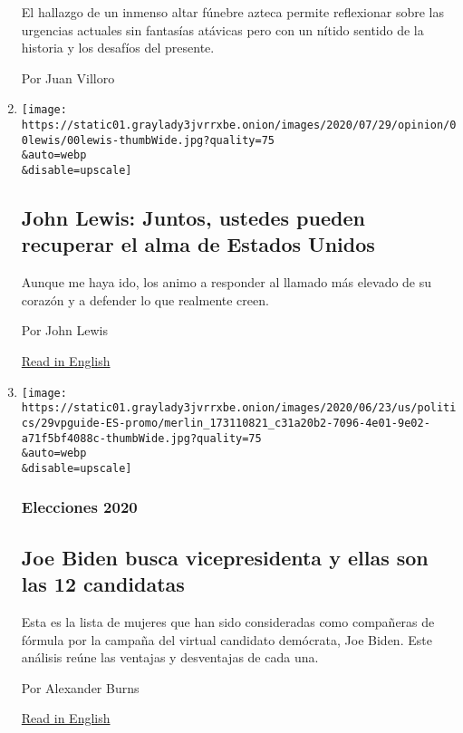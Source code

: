 \begin{enumerate}
  El hallazgo de un inmenso altar fúnebre azteca permite reflexionar
  sobre las urgencias actuales sin fantasías atávicas pero con un nítido
  sentido de la historia y los desafíos del presente.

  Por Juan Villoro
\item
  \href{/es/2020/07/30/espanol/opinion/john-lewis-derechos-civiles.html}{}

  \texttt{[image: https://static01.graylady3jvrrxbe.onion/images/2020/07/29/opinion/00lewis/00lewis-thumbWide.jpg?quality=75\\\&auto=webp\\\&disable=upscale]}

  \hypertarget{john-lewis-juntos-ustedes-pueden-recuperar-el-alma-de-estados-unidos}{%
  \subsection{John Lewis: Juntos, ustedes pueden recuperar el alma de
  Estados
  Unidos}\label{john-lewis-juntos-ustedes-pueden-recuperar-el-alma-de-estados-unidos}}

  Aunque me haya ido, los animo a responder al llamado más elevado de su
  corazón y a defender lo que realmente creen.

  Por John Lewis

  \href{https://www.nytimes3xbfgragh.onion/2020/07/30/opinion/john-lewis-civil-rights-america.html}{Read
  in English}
\item
  \href{/es/2020/07/29/espanol/estados-unidos/biden-vicepresidente.html}{}

  \texttt{[image: https://static01.graylady3jvrrxbe.onion/images/2020/06/23/us/politics/29vpguide-ES-promo/merlin\_173110821\_c31a20b2-7096-4e01-9e02-a71f5bf4088c-thumbWide.jpg?quality=75\\\&auto=webp\\\&disable=upscale]}

  \hypertarget{elecciones-2020-1}{%
  \subsubsection{Elecciones 2020}\label{elecciones-2020-1}}

  \hypertarget{joe-biden-busca-vicepresidenta-y-ellas-son-las-12-candidatas}{%
  \subsection{Joe Biden busca vicepresidenta y ellas son las 12
  candidatas}\label{joe-biden-busca-vicepresidenta-y-ellas-son-las-12-candidatas}}

  Esta es la lista de mujeres que han sido consideradas como compañeras
  de fórmula por la campaña del virtual candidato demócrata, Joe Biden.
  Este análisis reúne las ventajas y desventajas de cada una.

  Por Alexander Burns

  \href{https://www.nytimes3xbfgragh.onion/article/biden-vice-president-2020.html}{Read
  in English}
\end{enumerate}

